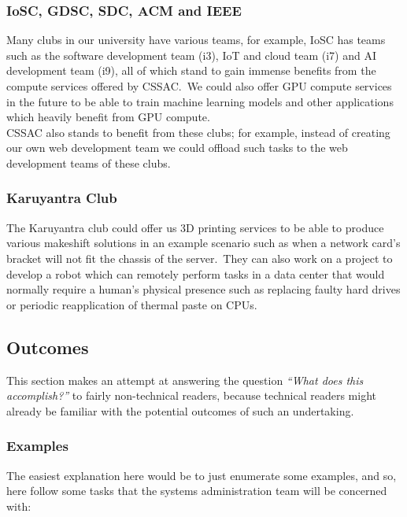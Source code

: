 \documentclass[11pt,twocolumn,oneside]{book}
\begin{document}
    \subsubsection{IoSC, GDSC, SDC, ACM and IEEE}
    Many clubs in our university have various teams, for example, IoSC has teams such as the software development team
    (i3), IoT and cloud team (i7) and AI development team (i9), all of which stand to gain immense benefits from the
    compute services offered by CSSAC.\ We could also offer GPU compute services in the future to be able to train
    machine learning models and other applications which heavily benefit from GPU compute.
    \\
    CSSAC also stands to benefit from these clubs; for example, instead of creating our own web development team we
    could offload such tasks to the web development teams of these clubs\@.

    \subsubsection{Karuyantra Club}
    The Karuyantra club could offer us 3D printing services to be able to produce various makeshift solutions in an
    example scenario such as when a network card's bracket will not fit the chassis of the server.\ They can also
    work on a project to develop a robot which can remotely perform tasks in a data center that would normally require a
    human's physical presence such as replacing faulty hard drives or periodic reapplication of thermal paste on CPUs.


    \subsection{Outcomes}\label{subsec:outcomes}
    This section makes an attempt at answering the question \emph{``What does this accomplish?''} to fairly non-technical
    readers, because technical readers might already be familiar with the potential outcomes of such an undertaking.

    \subsubsection{Examples}
    The easiest explanation here would be to just enumerate some examples, and so, here follow some tasks that the
    systems administration team will be concerned with:
\end{document}
